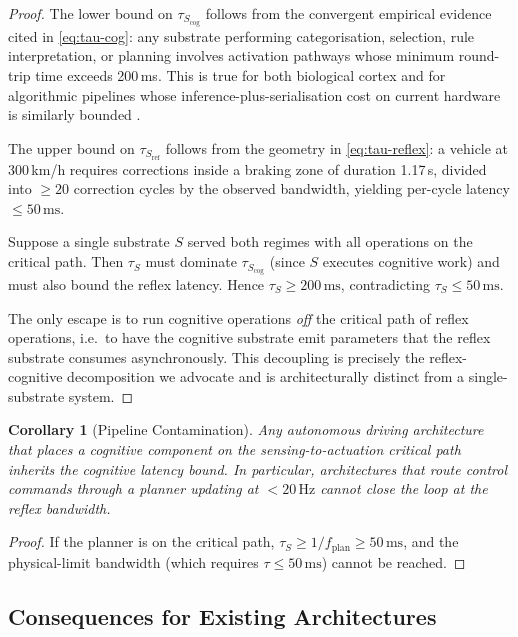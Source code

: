 \documentclass[11pt,twocolumn]{article}
\newtheorem{corollary}[theorem]{Corollary}
\theoremstyle{definition}
\theoremstyle{remark}
\begin{document}
\begin{proof}
The lower bound on $\tau_{S_{\mathrm{cog}}}$ follows from the convergent empirical evidence cited in \eqref{eq:tau-cog}: any substrate performing categorisation, selection, rule interpretation, or planning involves activation pathways whose minimum round-trip time exceeds 200\,ms. This is true for both biological cortex and for algorithmic pipelines whose inference-plus-serialisation cost on current hardware is similarly bounded \cite{schwarting2018planning,codevilla2018endtoend}.

The upper bound on $\tau_{S_{\mathrm{ref}}}$ follows from the geometry in \eqref{eq:tau-reflex}: a vehicle at 300\,km/h requires corrections inside a braking zone of duration 1.17\,s, divided into $\ge 20$ correction cycles by the observed bandwidth, yielding per-cycle latency $\le 50\,\mathrm{ms}$.

Suppose a single substrate $S$ served both regimes with all operations on the critical path. Then $\tau_S$ must dominate $\tau_{S_{\mathrm{cog}}}$ (since $S$ executes cognitive work) and must also bound the reflex latency. Hence $\tau_S \ge 200\,\mathrm{ms}$, contradicting $\tau_S \le 50\,\mathrm{ms}$.

The only escape is to run cognitive operations \emph{off} the critical path of reflex operations, i.e.\ to have the cognitive substrate emit parameters that the reflex substrate consumes asynchronously. This decoupling is precisely the reflex-cognitive decomposition we advocate and is architecturally distinct from a single-substrate system.
\end{proof}

\begin{corollary}[Pipeline Contamination]\label{cor:pipeline}
Any autonomous driving architecture that places a cognitive component on the sensing-to-actuation critical path inherits the cognitive latency bound. In particular, architectures that route control commands through a planner updating at $<20\,\mathrm{Hz}$ cannot close the loop at the reflex bandwidth.
\end{corollary}

\begin{proof}
If the planner is on the critical path, $\tau_S \ge 1/f_{\mathrm{plan}} \ge 50\,\mathrm{ms}$, and the physical-limit bandwidth (which requires $\tau \le 50\,\mathrm{ms}$) cannot be reached.
\end{proof}

\subsection{Consequences for Existing Architectures}
\end{document}
